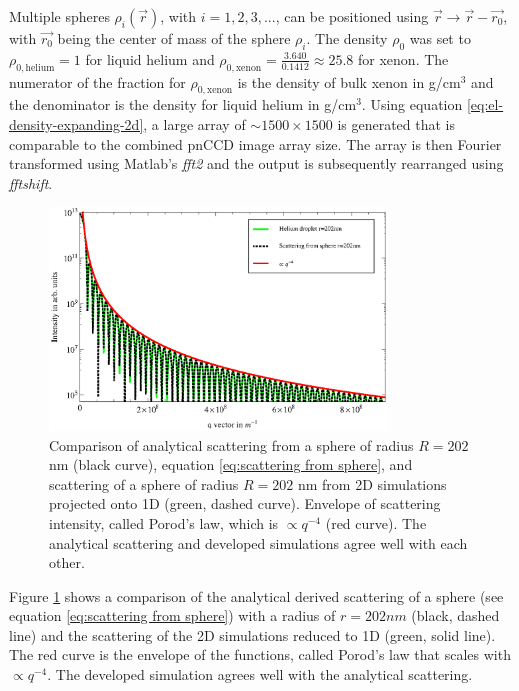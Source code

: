 Multiple spheres $\rho_{i}\left(\vec{r}\right)$, with $i=1,2,3,...$, can be positioned using $\vec{r}\rightarrow \vec{r}-\vec{r_{0}}$, with $\vec{r_{0}}$ being the center of mass of the sphere $\rho_{i}$. The density $\rho_{0}$ was set to $\rho_{0, \text{helium}}=1$ for liquid helium and $\rho_{0,\text{xenon}}=\frac{3.640}{0.1412}\approx 25.8$ for xenon. The numerator of the fraction for $\rho_{0,\text{xenon}}$ is the density of bulk xenon in g/cm$^{3}$ and the denominator is the density for liquid helium in g/cm$^{3}$. Using equation \eqref{eq:el-density-expanding-2d}, a large array of $\sim 1500\times 1500$ is generated that is comparable to the combined pnCCD image array size. The array is then Fourier transformed using Matlab's \textit{fft2} and the output is subsequently rearranged using \textit{fftshift}.\\
\begin{figure}
	\centering
		\includegraphics[width=0.80\textwidth]{images/cluster-sphere-intact.eps}
	\caption{Comparison of analytical scattering from a sphere of radius $R=202$ nm (black curve), equation \ref{eq:scattering from sphere}, and scattering of a sphere of radius $R=202$ nm from 2D simulations projected onto 1D (green, dashed curve). Envelope of scattering intensity, called Porod's law, which is $\propto q^{-4}$ (red curve). The analytical scattering and developed simulations agree well with each other.}
	\label{fig:cluster-sphere-intact-2D}
\end{figure}
Figure \ref{fig:cluster-sphere-intact-2D} shows a comparison of the analytical derived scattering of a sphere (see equation \ref{eq:scattering from sphere}) with a radius of $r=202nm$ (black, dashed line) and the scattering of the 2D simulations reduced to 1D (green, solid line). The red curve is the envelope of the functions, called Porod's law that scales with $\propto q^{-4}$. The developed simulation agrees well with the analytical scattering.
%
%
%